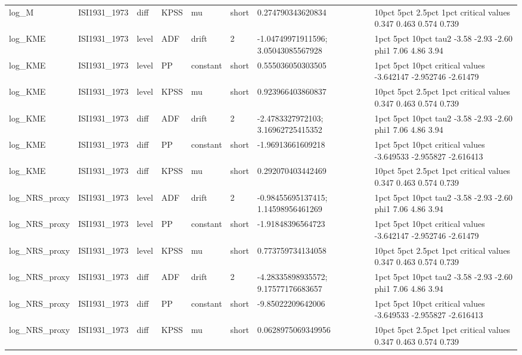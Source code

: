 \begin{tabular}{llllllll}
log\_M & ISI1931\_1973 & diff & KPSS & mu & short & 0.274790343620834 &                 10pct  5pct 2.5pct  1pct critical values 0.347 0.463  0.574 0.739 \\
log\_KME & ISI1931\_1973 & level & ADF & drift & 2 & -1.04749971911596; 3.05043085567928 &       1pct  5pct 10pct tau2 -3.58 -2.93 -2.60 phi1  7.06  4.86  3.94 \\
log\_KME & ISI1931\_1973 & level & PP & constant & short & 0.555036050303505 &                      1pct      5pct    10pct critical values -3.642147 -2.952746 -2.61479 \\
log\_KME & ISI1931\_1973 & level & KPSS & mu & short & 0.923966403860837 &                 10pct  5pct 2.5pct  1pct critical values 0.347 0.463  0.574 0.739 \\
log\_KME & ISI1931\_1973 & diff & ADF & drift & 2 & -2.4783327972103; 3.16962725415352 &       1pct  5pct 10pct tau2 -3.58 -2.93 -2.60 phi1  7.06  4.86  3.94 \\
log\_KME & ISI1931\_1973 & diff & PP & constant & short & -1.96913661609218 &                      1pct      5pct     10pct critical values -3.649533 -2.955827 -2.616413 \\
log\_KME & ISI1931\_1973 & diff & KPSS & mu & short & 0.292070403442469 &                 10pct  5pct 2.5pct  1pct critical values 0.347 0.463  0.574 0.739 \\
log\_NRS\_proxy & ISI1931\_1973 & level & ADF & drift & 2 & -0.98455695137415; 1.14598956461269 &       1pct  5pct 10pct tau2 -3.58 -2.93 -2.60 phi1  7.06  4.86  3.94 \\
log\_NRS\_proxy & ISI1931\_1973 & level & PP & constant & short & -1.91848396564723 &                      1pct      5pct    10pct critical values -3.642147 -2.952746 -2.61479 \\
log\_NRS\_proxy & ISI1931\_1973 & level & KPSS & mu & short & 0.773759734134058 &                 10pct  5pct 2.5pct  1pct critical values 0.347 0.463  0.574 0.739 \\
log\_NRS\_proxy & ISI1931\_1973 & diff & ADF & drift & 2 & -4.28335898935572; 9.17577176683657 &       1pct  5pct 10pct tau2 -3.58 -2.93 -2.60 phi1  7.06  4.86  3.94 \\
log\_NRS\_proxy & ISI1931\_1973 & diff & PP & constant & short & -9.85022209642006 &                      1pct      5pct     10pct critical values -3.649533 -2.955827 -2.616413 \\
log\_NRS\_proxy & ISI1931\_1973 & diff & KPSS & mu & short & 0.0628975069349956 &                 10pct  5pct 2.5pct  1pct critical values 0.347 0.463  0.574 0.739 \\

\end{tabular}
